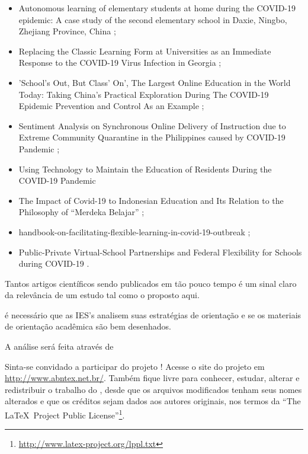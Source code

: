 \documentclass[
	arial,
	12pt,				%
	openright,			%
	twoside,			%
	a4paper,			%
	chapter=TITLE,		%
	english,			%
	french,				%
	spanish,			%
	brazil,				%
	]{abntex2}
\begin{document}
\begin{itemize}

  \item Autonomous learning of elementary students at home during the COVID-19 epidemic: A case study of the second elementary school in Daxie, Ningbo, Zhejiang Province, China \cite{xie2020autonomous};
  \item Replacing the Classic Learning Form at Universities as an Immediate Response to the COVID-19 Virus Infection in Georgia \cite{georgia};
  \item 'School’s Out, But Class’ On', The Largest Online Education in the World Today: Taking China’s Practical Exploration During The COVID-19 Epidemic Prevention and Control As an Example \cite{zhou2020school};
  \item Sentiment Analysis on Synchronous Online Delivery of Instruction due to Extreme Community Quarantine in the Philippines caused by COVID-19 Pandemic \cite{pastor2020sentiment};
  \item Using Technology to Maintain the Education of Residents During the COVID-19 Pandemic \cite{chick2020using}
  \item The Impact of Covid-19 to Indonesian Education and Its Relation to the Philosophy of “Merdeka Belajar” \cite{abidah2020impact};
  \item handbook-on-facilitating-flexible-learning-in-covid-19-outbreak \cite{huang2020handbook};
  \item Public-Private Virtual-School Partnerships and Federal Flexibility for Schools during COVID-19 \cite{butcher2020public}.

\end{itemize}

Tantos artigos científicos sendo publicados em tão pouco tempo é um sinal claro da relevância de um estudo tal como o proposto aqui. 
 



é necessário que as IES's analisem suas estratégias de orientação e se os materiais de orientação acadêmica são bem desenhados.


A análise será feita através de 


Sinta-se convidado a participar do projeto \abnTeX! Acesse o site do projeto em
\url{http://www.abntex.net.br/}. Também fique livre para conhecer,
estudar, alterar e redistribuir o trabalho do \abnTeX, desde que os arquivos
modificados tenham seus nomes alterados e que os créditos sejam dados aos
autores originais, nos termos da ``The \LaTeX\ Project Public
License''\footnote{\url{http://www.latex-project.org/lppl.txt}}.
\end{document}
